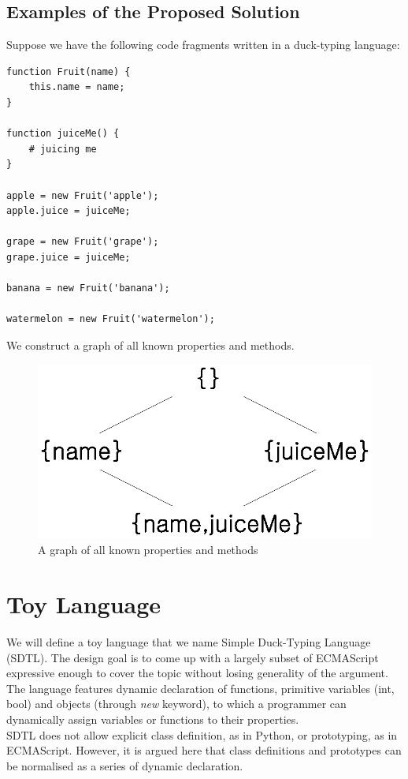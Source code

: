 \documentclass[a4paper,12pt]{article}
\begin{document}
\subsection{Examples of the Proposed Solution}
Suppose we have the following code fragments written in a duck-typing language:\\
\begin{lstlisting}[caption=Example: Fruits]
function Fruit(name) {
	this.name = name;
}

function juiceMe() {
	# juicing me
}

apple = new Fruit('apple');
apple.juice = juiceMe;

grape = new Fruit('grape');
grape.juice = juiceMe;

banana = new Fruit('banana');

watermelon = new Fruit('watermelon');
\end{lstlisting}
We construct a graph of all known properties and methods.\\
\begin{figure}
	\includegraphics{lattice1.eps}
	\caption{A graph of all known properties and methods}
\end{figure}
\section{Toy Language}
We will define a toy language that we name Simple Duck-Typing Language (SDTL). The design goal is to come up with a largely subset of ECMAScript expressive enough to cover the topic without losing generality of the argument. The language features dynamic declaration of functions, primitive variables (int, bool) and objects (through \textit{new} keyword), to which a programmer can dynamically assign variables or functions to their properties.\\
SDTL does not allow explicit class definition, as in Python, or prototyping, as in ECMAScript. However, it is argued here that class definitions and prototypes can be normalised as a series of dynamic declaration.\\
\end{document}
